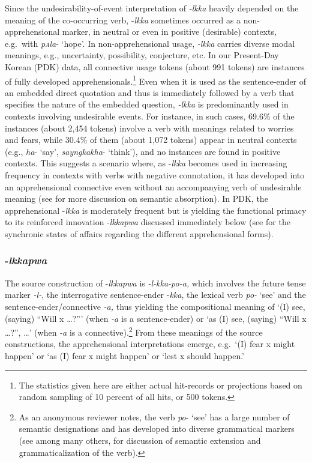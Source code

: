 \documentclass[output=paper,colorlinks,citecolor=brown]{langscibook}
\begin{document}
Since the undesirability-of-event interpretation of \textit{-lkka} heavily depended on the meaning of the co-occurring verb, \nobreakdash-\textit{lkka} sometimes occurred as a non-apprehensional marker, in neutral or even in positive (desirable) contexts, e.g.\  with \textit{p\textsc{a}la}- `hope'. In non-apprehensional usage, \textit{-lkka} carries diverse modal meanings, e.g., uncertainty, possibility, conjecture, etc. In our Present-Day Korean (PDK) data, all connective usage tokens (about 991 tokens) are instances of fully developed apprehensionals.\footnote{The statistics given here are either actual hit-records or projections based on random sampling of 10 percent of all hits, or 500 tokens.} Even when it is used as the sentence-ender of an embedded direct quotation and thus is immediately followed by a verb that specifies the nature of the embedded question, \textit{-lkka} is predominantly used in contexts involving undesirable events. For instance, in such cases, 69.6\% of the instances (about 2,454 tokens) involve a verb with meanings related to worries and fears, while 30.4\% of them (about 1,072 tokens) appear in neutral contexts (e.g., \textit{ha}- `say', \textit{sayngkakha}- `think'), and no instances are found in positive contexts. This suggests a scenario where, as \nobreakdash-\textit{lkka} becomes used in increasing frequency in contexts with verbs with negative connotation, it has developed into an apprehensional connective even without an accompanying verb of undesirable meaning (see  for more discussion on semantic absorption). In PDK, the apprehensional \nobreakdash-\textit{lkka} is moderately frequent but is yielding the functional primacy to its reinforced innovation \nobreakdash-\textit{lkkapwa} discussed immediately below (see  for the synchronic states of affairs regarding the different apprehensional forms).

\subsubsection{-\textit{lkkapwa}} 
The source construction of \nobreakdash-\textit{lkkapwa} is \textit{-l-kka-po-a,} which involves the future tense marker \textit{-l-}, the interrogative sentence-ender \nobreakdash-\textit{kka}, the lexical verb \textit{po-} `see' and the sentence-ender/connective \textit{-a,} thus yielding the compositional meaning of `(I) see, (saying) ``Will x …?''' (when \textit{-a} is a sentence-ender) or `as (I) see, (saying) ``Will x …?'',  …' (when \textit{-a} is a connective).\footnote{As an anonymous reviewer notes, the verb \textit{po}- `see' has a large number of semantic designations and has developed into diverse grammatical markers (see \citealt{Rhee2019, Rhee2020, Rhee2021b, Rhee2021a} among many others, for discussion of semantic extension and grammaticalization of the verb).} From these meanings of the source constructions, the apprehensional interpretations emerge, e.g.\  `(I) fear x might happen' or `as (I) fear x might happen' or `lest x should happen.'
\end{document}
